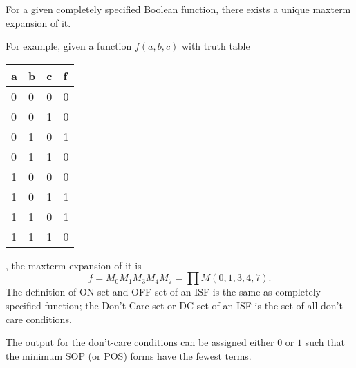 \documentclass[a4paper,12pt]{article}
\begin{document}
\begin{itemize}
\begin{itemize}
\begin{itemize}
\begin{itemize}
\begin{itemize}
\begin{itemize}
\begin{itemize}
For a given completely specified Boolean function, there exists a unique maxterm expansion of it.

For example, given a function $f(a,b,c)$ with truth table
\begin{longtable}[c]{|m|m|m|m|}
\hline
a & b & c & f\\\hline
0 & 0 & 0 & 0\\\hline
0 & 0 & 1 & 0\\\hline
0 & 1 & 0 & 1\\\hline
0 & 1 & 1 & 0\\\hline
1 & 0 & 0 & 0\\\hline
1 & 0 & 1 & 1\\\hline
1 & 1 & 0 & 1\\\hline
1 & 1 & 1 & 0\\\hline
\end{longtable}
, the maxterm expansion of it is
\[f=M_0M_1M_3M_4M_7=\prod M(0,1,3,4,7).\]
The definition of ON-set and OFF-set of an ISF is the same as completely specified function; the Don't-Care set or DC-set of an ISF is the set of all don't-care conditions.

The output for the don't-care conditions can be assigned either $0$ or $1$ such that the minimum SOP (or POS) forms have the fewest terms.


\end{itemize}
\end{itemize}
\end{itemize}
\end{itemize}
\end{itemize}
\end{itemize}
\end{itemize}
\end{document}

